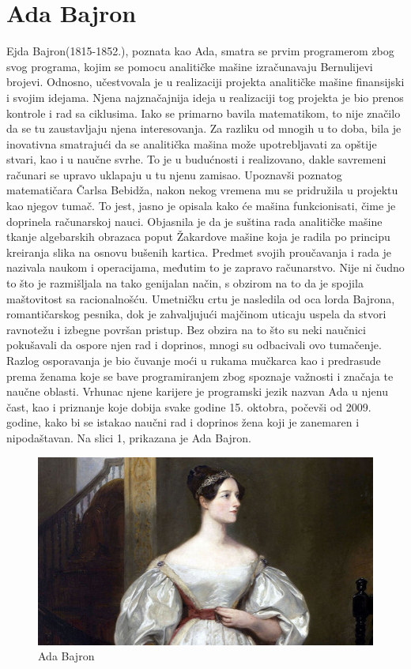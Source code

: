 \documentclass[a4paper,12pt]{article}
\begin{document}
\newpage
\section{Ada Bajron}

\begin{flushleft}
    Ejda Bajron(1815-1852.), poznata kao Ada, smatra se prvim programerom zbog svog programa, kojim se pomocu analitičke mašine izračunavaju Bernulijevi brojevi. Odnosno, učestvovala je u realizaciji projekta analitičke mašine finansijski i svojim idejama. Njena najznačajnija ideja u realizaciji tog projekta je bio prenos kontrole i rad sa ciklusima. Iako se primarno bavila matematikom, to nije značilo da se tu zaustavljaju njena interesovanja. Za razliku od mnogih u to doba, bila je inovativna smatrajući da se analitička mašina može upotrebljavati za opštije stvari, kao i u naučne svrhe. To je u budućnosti i realizovano, dakle savremeni računari se upravo uklapaju u tu njenu zamisao. Upoznavši poznatog matematičara Čarlsa Bebidža, nakon nekog vremena mu se pridružila u projektu kao njegov tumač. To jest, jasno je opisala kako će mašina funkcionisati, čime je doprinela računarskoj nauci. Objasnila je da je suština rada analitičke mašine tkanje algebarskih obrazaca poput Žakardove mašine koja je radila po principu kreiranja slika na osnovu bušenih kartica. Predmet svojih proučavanja i rada je nazivala naukom i operacijama, međutim to je zapravo računarstvo. Nije ni čudno to što je razmišljala na tako genijalan način, s obzirom na to da je spojila maštovitost sa racionalnošću. Umetničku crtu je nasledila od oca lorda Bajrona, romantičarskog pesnika, dok je zahvaljujući majčinom uticaju uspela da stvori ravnotežu i izbegne površan pristup. Bez obzira na to što su neki naučnici pokušavali da ospore njen rad i doprinos, mnogi su odbacivali ovo tumačenje. Razlog osporavanja je bio čuvanje moći u rukama mučkarca kao i predrasude prema ženama koje se bave programiranjem zbog spoznaje važnosti i značaja te naučne oblasti. Vrhunac njene karijere je programski jezik nazvan Ada u njenu čast, kao i priznanje koje dobija svake godine 15. oktobra, počevši od 2009. godine, kako bi se istakao naučni rad i doprinos žena koji je zanemaren i nipodaštavan. Na slici 1, prikazana je Ada Bajron.
\end{flushleft}

\begin{figure}[h]
    \centering
    \includegraphics[width = .6\textwidth]{adabajron.jpg}
    \caption{Ada Bajron}
    \label{fig:my_label}
\end{figure}
\end{document}
